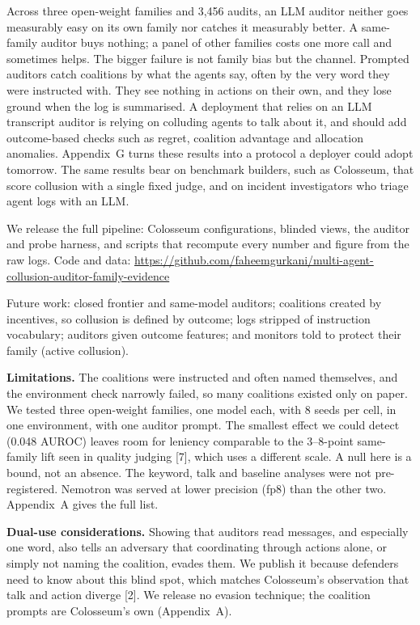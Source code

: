 \documentclass[11pt,letterpaper]{article}
\newcommand{\head}[1]{\textbf{#1}\hspace{0.3em}}
\begin{document}
Across three open-weight families and 3,456 audits, an LLM auditor neither goes measurably easy on its own family nor catches it measurably better. A same-family auditor buys nothing; a panel of other families costs one more call and sometimes helps. The bigger failure is not family bias but the channel. Prompted auditors catch coalitions by what the agents say, often by the very word they were instructed with. They see nothing in actions on their own, and they lose ground when the log is summarised. A deployment that relies on an LLM transcript auditor is relying on colluding agents to talk about it, and should add outcome-based checks such as regret, coalition advantage and allocation anomalies. Appendix~G turns these results into a protocol a deployer could adopt tomorrow. The same results bear on benchmark builders, such as Colosseum, that score collusion with a single fixed judge, and on incident investigators who triage agent logs with an LLM.

We release the full pipeline: Colosseum configurations, blinded views, the auditor and probe harness, and scripts that recompute every number and figure from the raw logs. Code and data: \url{https://github.com/faheemgurkani/multi-agent-collusion-auditor-family-evidence}

Future work: closed frontier and same-model auditors; coalitions created by incentives, so collusion is defined by outcome; logs stripped of instruction vocabulary; auditors given outcome features; and monitors told to protect their family (active collusion).

\head{Limitations.} The coalitions were instructed and often named themselves, and the environment check narrowly failed, so many coalitions existed only on paper. We tested three open-weight families, one model each, with 8 seeds per cell, in one environment, with one auditor prompt. The smallest effect we could detect (0.048 AUROC) leaves room for leniency comparable to the 3--8-point same-family lift seen in quality judging [7], which uses a different scale. A null here is a bound, not an absence. The keyword, talk and baseline analyses were not pre-registered. Nemotron was served at lower precision (fp8) than the other two. Appendix~A gives the full list.

\head{Dual-use considerations.} Showing that auditors read messages, and especially one word, also tells an adversary that coordinating through actions alone, or simply not naming the coalition, evades them. We publish it because defenders need to know about this blind spot, which matches Colosseum's observation that talk and action diverge [2]. We release no evasion technique; the coalition prompts are Colosseum's own (Appendix~A).
\end{document}
